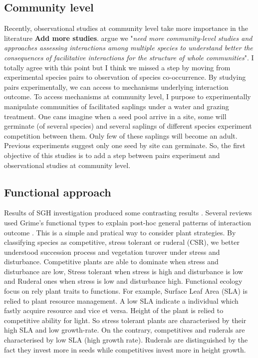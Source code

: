 \documentclass[12pt]{article} %
\begin{document}
\subsection{Community level}
Recently, observational studies at community level take more importance in the literature \citep{Soliveres2012, Gross2013, Soliveres2014b} \textbf{Add more studies}. 
\citet{Soliveres2014} argue we "\textit{need more community-level studies and approaches assessing interactions among multiple species to understand better the consequences of facilitative interactions for the structure of whole communities}". 
I totally agree with this point but I think we missed a step by moving from experimental species pairs to observation of species co-occurrence. By studying pairs experimentally, we can access to mechanisms underlying interaction outcome. 
To access mechanisms at community level, I purpose to experimentally manipulate communities of facilitated saplings under a water and grazing treatment.
One cans imagine when a seed pool arrive in a site, some will germinate (of several species) and several saplings of different species experiment competition between them. Only few of these saplings will become an adult. Previous experiments suggest only one seed by site can germinate. So, the first objective of this studies is to add a step between pairs experiment and observational studies at community level.

\subsection{Functional approach}
Results of SGH investigation produced some contrasting results \citep{Maestre2009}. Several reviews used Grime's functional types to explain post-hoc general patterns of interaction outcome \citep{Maestre2009,Butterfield2013}. %
This is a simple and pratical way to consider plant strategies. By classifying species as competitive, stress tolerant or ruderal (CSR), we better understood succession process and vegetation turover under stress and disturbance. Competitive plants are able to dominate when stress and disturbance are low, Stress tolerant when stress is high and disturbance is low and Ruderal ones when stress is low and disturbance high.%
Functional ecology focus on rely plant traits to functions. For example, Surface Leaf Area (SLA) is relied to plant resource management. A low SLA indicate a individual which fastly acquire resource and vice et versa. Height of the plant is relied to competitive ability for light. So stress tolerant plants are characterised by their high SLA and low growth-rate. On the contrary, competitives and ruderals are characterised by low SLA (high growth rate). Ruderals are distinguished by the fact they invest more in seeds while competitives invest more in height growth.
\end{document}
